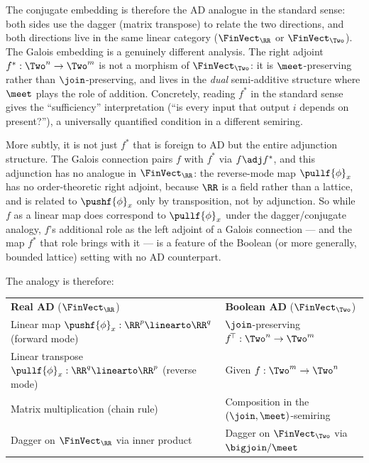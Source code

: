 The conjugate embedding is therefore the AD analogue in the standard sense: both sides use the dagger
(matrix transpose) to relate the two directions, and both directions live in the same linear category
($\FinVect_\RR$ or $\FinVect_\Two$). The Galois embedding is a genuinely different analysis. The right
adjoint $f^*: \Two^n \to \Two^m$ is not a morphism of $\FinVect_\Two$: it is $\meet$-preserving rather than
$\join$-preserving, and lives in the \emph{dual} semi-additive structure where $\meet$ plays the role of
addition. Concretely, reading $f^*$ in the standard sense gives the ``sufficiency'' interpretation (``is
every input that output $i$ depends on present?''), a universally quantified condition in a different
semiring.

More subtly, it is not just $f^*$ that is foreign to AD but the entire adjunction structure. The Galois
connection pairs $f$ with $f^*$ via $f \adj f^*$, and this adjunction has no analogue in $\FinVect_\RR$: the
reverse-mode map $\pullf{\phi}_x$ has no order-theoretic right adjoint, because $\RR$ is a field rather than
a lattice, and is related to $\pushf{\phi}_x$ only by transposition, not by adjunction. So while $f$ as a
linear map does correspond to $\pullf{\phi}_x$ under the dagger/conjugate analogy, $f$'s additional role as
the left adjoint of a Galois connection --- and the map $f^*$ that role brings with it --- is a
feature of the Boolean (or more generally, bounded lattice) setting with no AD counterpart.

The analogy is therefore:

\begin{center}
\begin{tabular}{ll}
 \textbf{Real AD} ($\FinVect_\RR$) & \textbf{Boolean AD} ($\FinVect_\Two$) \\
 Linear map $\pushf{\phi}_x: \RR^p \linearto \RR^q$ (forward mode) & $\join$-preserving $f^{\!\top}: \Two^n \to \Two^m$ \\
 Linear transpose $\pullf{\phi}_x: \RR^q \linearto \RR^p$ (reverse mode) & Given $f: \Two^m \to \Two^n$ \\
 Matrix multiplication (chain rule) & Composition in the $(\join, \meet)$-semiring \\
 Dagger on $\FinVect_\RR$ via inner product & Dagger on $\FinVect_\Two$ via $\bigjoin / \meet$ \\
\end{tabular}
\end{center}
